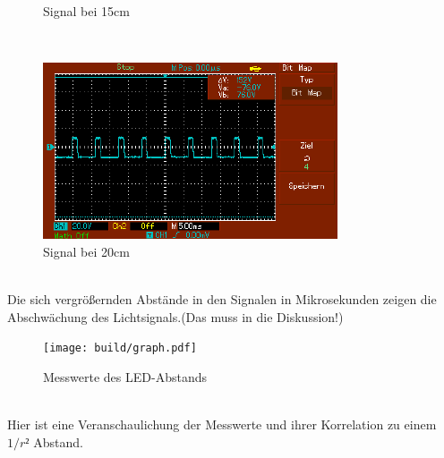 \documentclass[captions=tableheading]{scrartcl}
\begin{document}
\begin{itemize}
\begin{figure}
                \caption{Signal bei 15cm}
                \label{fig:15cmled}
            \end{figure}   
            \\
            \begin{figure} 
                \centering  
                \includegraphics{Lock_In Bilder/Aufgabe 4/MAP004.pdf}
                \caption{Signal bei 20cm}
                \label{fig:20cmled}    
            \end{figure}
            \\
        Die sich vergrößernden Abstände in den Signalen in Mikrosekunden zeigen die Abschwächung des Lichtsignals.(Das muss in die Diskussion!)
            \begin{figure}
                \centering
                \texttt{[image: build/graph.pdf]}
                \caption{Messwerte des LED-Abstands}
                \label{fig:graph}
            \end{figure}
        \\
        Hier ist eine Veranschaulichung der Messwerte und ihrer Korrelation zu einem \(1/r²\) Abstand.
    \end{itemize}
\end{document}
